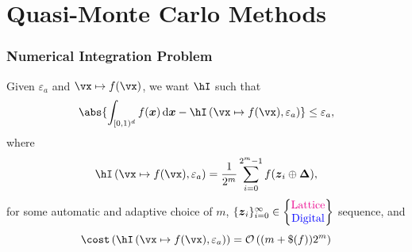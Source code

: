\documentclass[11pt,compress]{beamer} %
\newcommand{\cube}{[0,1)^d}
\newcommand{\bsz}{\boldsymbol{z}}    %
\newcommand{\bsx}{\boldsymbol{x}}    %
\newcommand{\bsDelta}{\boldsymbol{\Delta}}    %
\newcommand{\D}{{\rm d}}
\DeclareMathOperator{\Var}{Var}
\newcommand{\intalg}{\hI\left(\vx\mapsto f(\vx),\varepsilon_a\right)}
\begin{document}

\section{Quasi-Monte Carlo Methods}

\begin{frame}
\frametitle{Numerical Integration Problem}
Given $\varepsilon_a$ and $\vx\mapsto f(\vx)$, we want $\hI$ such that
\[
\abs{\int_{\cube} f(\bsx)\,\D\bsx - \intalg}\leq \varepsilon_a,
\]
where
\[
\intalg = \frac{1}{2^m} \sum_{i=0}^{2^m-1} f(\bsz_i \oplus\bsDelta),
\]
for some \alert{automatic} and \alert{adaptive} choice of $m$, $\{\bsz_i\}_{i=0}^{\infty}
\in\begin{Bmatrix}\textcolor{magenta}{\text{Lattice}}\\\textcolor{blue}{\text{Digital}}\end{Bmatrix}$ sequence, and
\[
\cost\left(\intalg\right)=\mathcal{O}\left((m+\$(f))2^m\right)
\]
\end{frame}
\end{document}
